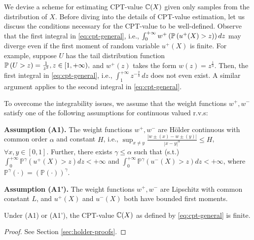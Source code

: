 
We devise a scheme for estimating CPT-value $\mathbb{C}(X)$  given only samples from the distribution of $X$.
Before diving into the details of CPT-value estimation, let us discuss the conditions necessary for the CPT-value to be well-defined.
Observe that the first integral in \eqref{eq:cpt-general}, i.e., 
$\int_0^{+\infty} w^+\left(\mathbb{P}\left( u^+(X)>z \right)\right) d z$
may diverge even if the first moment of random variable $u^+(X)$ is finite. 
For example, suppose $U$ has the tail distribution function
$\mathbb{P}\left( U>z \right)  = \frac{1}{z^2}, z\in [1, +\infty),$
 and $w^+(z)$ takes the form $w(z) = z^{\frac{1}{3}}$. Then, the first integral in \eqref{eq:cpt-general}, i.e.,
$
\int_1^{+\infty}  z^{-\frac{2}{3}}\, dz
$
does not even exist. A similar argument applies to the second integral in \eqref{eq:cpt-general}.

To overcome the integrability issues, we assume that the weight functions $w^+, w^-$ satisfy one of the following assumptions for continuous valued r.v.s: 

\noindent\textbf{Assumption (A1).}  
The weight functions $w^+, w^-$ are H\"{o}lder continuous with common order $\alpha$ and constant $H$, i.e.,
$\sup_{x \neq y} \frac{| w{\pm}(x) - w{\pm}(y) |}{| x-y |^{\alpha}} \leq H$, $\forall x,y \in [0,1]$.
 Further,
there exists $ \gamma \le \alpha$ such that (s.t.)
$\int_0^{+\infty} \mathbb{P}^{\gamma} (u^+(X)>z) dz < +\infty$ and $\int_0^{+\infty} \mathbb{P}^{\gamma} (u^-(X)>z) dz < +\infty$,
where $\mathbb{P}^{\gamma}(\cdot) = \left(\mathbb{P}(\cdot)\right)^{\gamma}$.

\noindent\textbf{Assumption (A1').}  The weight functions $w^+, w^-$ are Lipschitz with common constant $L$, and 
$u^+(X)$ and $u^-(X)$ both have bounded first moments.

\begin{proposition}
\label{prop:cpt-finite}
Under (A1) or (A1'), the CPT-value $\mathbb{C}(X)$ as defined by \eqref{eq:cpt-general} is finite. 
\end{proposition}
\begin{proof}
See Section \ref{sec:holder-proofs}.
\end{proof}

